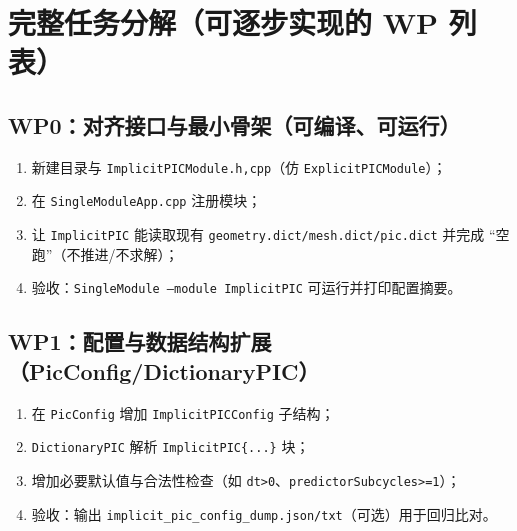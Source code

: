 \documentclass[UTF8,a4paper,12pt]{ctexart}
\newcommand{\code}[1]{\texttt{#1}}
\begin{document}
\section{完整任务分解（可逐步实现的 WP 列表）}

\subsection*{WP0：对齐接口与最小骨架（可编译、可运行）}
\begin{enumerate}[leftmargin=2em]
  \item 新建目录与 \code{ImplicitPICModule.{h,cpp}}（仿 \code{ExplicitPICModule}）；
  \item 在 \code{SingleModuleApp.cpp} 注册模块；
  \item 让 \code{ImplicitPIC} 能读取现有 \code{geometry.dict/mesh.dict/pic.dict} 并完成 ``空跑''（不推进/不求解）；
  \item 验收：\code{SingleModule --module ImplicitPIC} 可运行并打印配置摘要。
\end{enumerate}

\subsection*{WP1：配置与数据结构扩展（PicConfig/DictionaryPIC）}
\begin{enumerate}[leftmargin=2em]
  \item 在 \code{PicConfig} 增加 \code{ImplicitPICConfig} 子结构；
  \item \code{DictionaryPIC} 解析 \code{ImplicitPIC\{...\}} 块；
  \item 增加必要默认值与合法性检查（如 \code{dt>0}、\code{predictorSubcycles>=1}）；
  \item 验收：输出 \code{implicit_pic_config_dump.json/txt}（可选）用于回归比对。
\end{enumerate}
\end{document}
